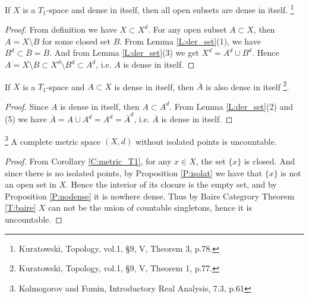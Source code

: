 \begin{theorem} \label{dii_open}
If $X$ is a $T_1$-space and dense in itself, then all open subsets are dense in
itself.
\footnote{Kuratowski, Topology, vol.1, \S 9, V, Theorem 3, p.78.}
\end{theorem}
\begin{proof}
From definition we have $X\subset X^d$. For any open subset $A\subset X$, then
$A=X\setminus B$ for some closed set $B$. From Lemma \ref{L:der_set}(1), we have
$B^d\subset\overline{B}=B$. And from Lemma \ref{L:der_set}(3) we get 
$X^d=A^d\cup B^d$. Hence $A=X\setminus B\subset X^d\setminus B^d\subset A^d$,
i.e. $A$ is dense in itself.
\end{proof}

\begin{theorem} \label{dii_clo}
If $X$ is a $T_1$-space and $A\subset X$ is dense in itself, then $\overline{A}$
is also dense in itself
\footnote{Kuratowski, Topology, vol.1, \S 9, V, Theorem 1, p.77.}.
\end{theorem}
\begin{proof}
Since $A$ is dense in itself, then $A\subset A^d$. From Lemma \ref{L:der_set}(2)
and (5) we have $\overline{A}=A\cup A^d=A^d=\overline{A}^d$, i.e. $\overline{A}$
is dense in itself.
\end{proof}

\begin{corollary} \label{C:comp_uncount}
\footnote{Kolmogorov and Fomin, Introductory Real Analysis, 7.3, p.61}
A complete metric space $(X,d)$ without isolated points is uncountable.
\end{corollary}
\begin{proof}
From Corollary \ref{C:metric_T1}, for any $x\in X$, the set $\{x\}$ is closed.
And since there is no isolated points, by Proposition \ref{P:isolat} we have 
that $\{x\}$ is not an open set in $X$.
Hence the interior of its closure is the empty set, and by Proposition
\ref{P:nodense}
it is nowhere dense.
Thus by Baire Categrory Theorem \ref{T:baire} $X$ can not be the union of 
countable singletons, hence it is uncountable.
\end{proof}



